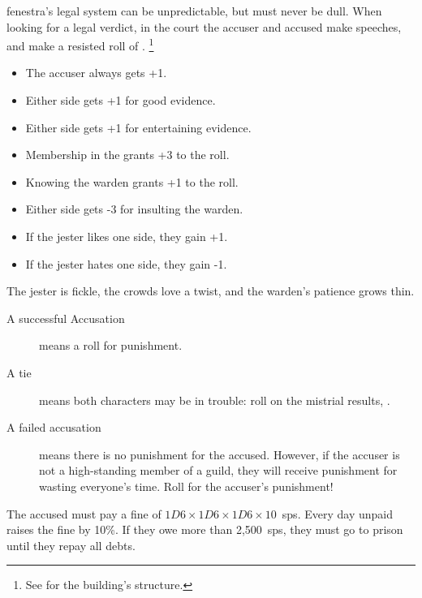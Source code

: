 \begin{multicols}{2}
\Gls{fenestra}'s legal system can be unpredictable, but must never be dull.
When looking for a legal verdict, in the \gls{court} the accuser and accused make speeches, and make a resisted roll of .%
\footnote{See  for the building's structure.}

\begin{itemize}
  \item
  The accuser always gets +1.
  \item
  Either side gets +1 for good evidence.
  \item
  Either side gets +1 for entertaining evidence.
  \item
  Membership in the  grants +3 to the roll.
  \item
  Knowing the \gls{warden} grants +1 to the roll.
  \item
  Either side gets -3 for insulting the \gls{warden}.
  \item
  If the jester likes one side, they gain +1.
  \item
  If the jester hates one side, they gain -1.
\end{itemize}

The jester is fickle, the crowds love a twist, and the \gls{warden}'s patience grows thin.

\null
\begin{description}
  \item[A successful Accusation]
  means a roll for punishment.
  \item[A tie]
  means both characters may be in trouble: roll on the mistrial results, .
  \item[A failed accusation]
  means there is no punishment for the accused.
  However, if the accuser is not a high-standing member of a guild, they will receive punishment for wasting everyone's time.
  Roll for the accuser's punishment!
\end{description}

\begin{dlist}
  \item
  \ifodd\value{temperature}
    The accused must pay a fine of $1D6\times 1D6\times 1D6\times 10$~\glspl{sp}.
    Every day unpaid raises the fine by 10\%.
    If they owe more than 2,500~\glspl{sp}, they must go to prison until they repay all debts.


\end{dlist}
\end{multicols}
